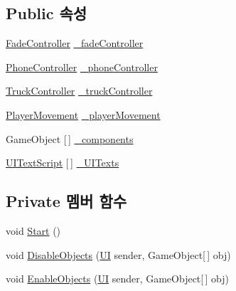 \subsection*{Public 속성}
\begin{DoxyCompactItemize}
\item 
\mbox{\hyperlink{class_fade_controller}{Fade\+Controller}} \mbox{\hyperlink{class_stage_manager_a90c76da0dbd44f1bf1c95f4209bb3a67}{\+\_\+fade\+Controller}}
\item 
\mbox{\hyperlink{class_phone_controller}{Phone\+Controller}} \mbox{\hyperlink{class_stage_manager_ab149ce928c50cb739755f24a532b373c}{\+\_\+phone\+Controller}}
\item 
\mbox{\hyperlink{class_truck_controller}{Truck\+Controller}} \mbox{\hyperlink{class_stage_manager_acb005133cca2300f649200ad843d49bf}{\+\_\+truck\+Controller}}
\item 
\mbox{\hyperlink{class_player_movement}{Player\+Movement}} \mbox{\hyperlink{class_stage_manager_ac6ae36d1451fad99c1a2320c975b0157}{\+\_\+player\+Movement}}
\item 
Game\+Object \mbox{[}$\,$\mbox{]} \mbox{\hyperlink{class_stage_manager_a7569408c048126ff3953004fee6cbc47}{\+\_\+components}}
\item 
\mbox{\hyperlink{class_u_i_text_script}{U\+I\+Text\+Script}} \mbox{[}$\,$\mbox{]} \mbox{\hyperlink{class_stage_manager_a50700b1afb580935b19b70cb70e404dd}{\+\_\+\+U\+I\+Texts}}
\end{DoxyCompactItemize}
\subsection*{Private 멤버 함수}
\begin{DoxyCompactItemize}
\item 
void \mbox{\hyperlink{class_stage_manager_ac5b1a1bb9910775d93dd65bb4119cb36}{Start}} ()
\item 
void \mbox{\hyperlink{class_stage_manager_a1b43416bf411137f34909060d4325ec7}{Disable\+Objects}} (\mbox{\hyperlink{class_u_i}{UI}} sender, Game\+Object\mbox{[}$\,$\mbox{]} obj)
\item 
void \mbox{\hyperlink{class_stage_manager_ada6e7c6bb79b460b0be80bee74c3796d}{Enable\+Objects}} (\mbox{\hyperlink{class_u_i}{UI}} sender, Game\+Object\mbox{[}$\,$\mbox{]} obj)
\end{DoxyCompactItemize}
